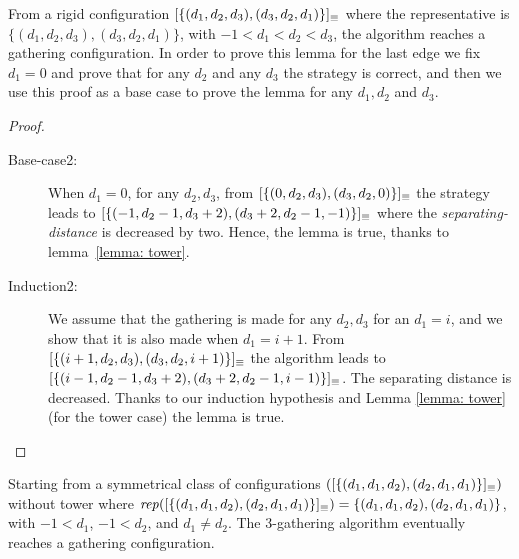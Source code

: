 From a rigid configuration $[\{(d_1, d_2, d_3),(d_3,d_2,d_1)\}]_{\equiv}$ where 
the representative is $\{(d_1, d_2, d_3),(d_3,d_2,d_1)\}$, with $-1 < d_1 < d_2 < d_3$, 
the algorithm reaches a gathering configuration.
In order to prove this lemma for the last edge we fix $d_1=0$
and prove that for any $d_2$ and any $d_3$ the strategy is correct, 
and then we use this proof as a base case to prove the lemma
for any $d_1, d_2$ and $d_3$.
	
	\begin{proof}\hfill
	\begin{description}%
		\item [Base-case2:  ] 
	When $d_1=0$, for any $d_2, d_3$, from $[\{(0, d_2, d_3),(d_3,d_2,0)\}]_{\equiv}$ the strategy 
	leads to $[\{(-1, d_2-1, d_3+2),(d_3+2,d_2-1,-1)\}]_{\equiv}$ where the \emph{separating-distance} is decreased by two.
	Hence, the lemma is true, thanks to lemma~\ref{lemma: tower}.
		 \item [Induction2:  ]%
	We assume that the gathering is made for any $d_2, d_3$ for 
	an $d_1=i$, and we show that it is also made when $d_1=i+1$.
	From $[\{(i+1, d_2, d_3),(d_3,d_2,i+1)\}]_{\equiv}$ the algorithm leads to $[\{(i-1, d_2-1, d_3+2),(d_3+2,d_2-1,i-1)\}]_{\equiv}$.
	The separating distance is decreased.
	Thanks to our induction hypothesis and Lemma \ref{lemma: tower} (for the tower case) the lemma is true. 
	\end{description}
	\end{proof}


\begin{lemma}
\label{lemma: sym1}
Starting from a symmetrical class of configurations $([\{(d_1, d_1, d_2),(d_2,d_1,d_1)\}]_{\equiv})$ without tower where 
$\mathit{rep}([\{(d_1, d_1, d_2),(d_2,d_1,d_1)\}]_{\equiv}) =  \{(d_1, d_1, d_2),(d_2,d_1,d_1)\}$, with $-1 < d_1$, $-1 < d_2$, and $d_1 \neq d_2$.
The 3-gathering algorithm %
eventually reaches a gathering configuration.
\end{lemma}
	
